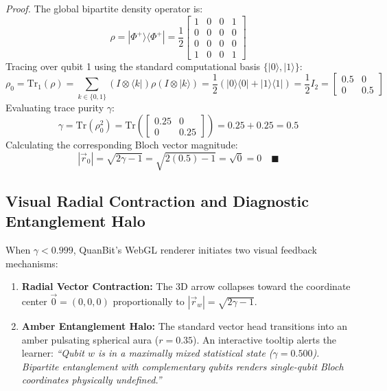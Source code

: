 \documentclass[11pt, a4paper]{article}
\begin{document}
\vspace{0.2cm}
\begin{singlespace}
\noindent\textit{Proof.} The global bipartite density operator is:
$$\rho = |\Phi^+\rangle\langle\Phi^+| = \frac{1}{2}\begin{bmatrix} 1 & 0 & 0 & 1 \\ 0 & 0 & 0 & 0 \\ 0 & 0 & 0 & 0 \\ 1 & 0 & 0 & 1 \end{bmatrix}$$
Tracing over qubit 1 using the standard computational basis $\{|0\rangle, |1\rangle\}$:
$$\rho_0 = \text{Tr}_1(\rho) = \sum_{k \in \{0, 1\}} (I \otimes \langle k|)\rho(I \otimes |k\rangle) = \frac{1}{2}(|0\rangle\langle 0| + |1\rangle\langle 1|) = \frac{1}{2}I_2 = \begin{bmatrix} 0.5 & 0 \\ 0 & 0.5 \end{bmatrix}$$
Evaluating trace purity $\gamma$:
$$\gamma = \text{Tr}(\rho_0^2) = \text{Tr}\left( \begin{bmatrix} 0.25 & 0 \\ 0 & 0.25 \end{bmatrix} \right) = 0.25 + 0.25 = 0.5$$
Calculating the corresponding Bloch vector magnitude:
$$|\vec{r}_0| = \sqrt{2\gamma - 1} = \sqrt{2(0.5) - 1} = \sqrt{0} = 0 \quad \blacksquare$$
\end{singlespace}
\vspace{0.2cm}

\subsection{Visual Radial Contraction and Diagnostic Entanglement Halo}
When $\gamma < 0.999$, QuanBit's WebGL renderer initiates two visual feedback mechanisms:
\begin{enumerate}[label=\textbf{\arabic*.}]
	\item \textbf{Radial Vector Contraction:} The 3D arrow collapses toward the coordinate center $\vec{0} = (0,0,0)$ proportionally to $|\vec{r}_w| = \sqrt{2\gamma - 1}$.
	\item \textbf{Amber Entanglement Halo:} The standard vector head transitions into an amber pulsating spherical aura ($r = 0.35$). An interactive tooltip alerts the learner: \textit{``Qubit $w$ is in a maximally mixed statistical state ($\gamma=0.500$). Bipartite entanglement with complementary qubits renders single-qubit Bloch coordinates physically undefined.''}
\end{enumerate}
\end{document}

